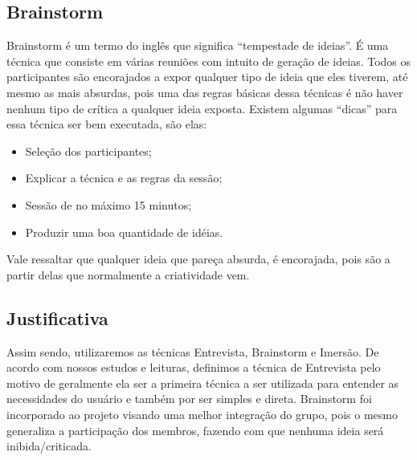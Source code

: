 \subsection{Brainstorm}
Brainstorm é um termo do inglês que significa “tempestade de ideias”. É uma técnica que consiste em várias reuniões com intuito de geração de ideias. Todos os participantes são encorajados a expor qualquer tipo de ideia que eles tiverem, até mesmo as mais absurdas, pois uma das regras básicas dessa técnicas é não haver nenhum tipo de crítica a qualquer ideia exposta. Existem algumas “dicas” para essa técnica ser bem executada, são elas:
\begin{itemize}
\item{Seleção dos participantes;}
\item{Explicar a técnica e as regras da sessão;}
\item{Sessão de no máximo 15 minutos;}
\item{Produzir uma boa quantidade de idéias.}
\end{itemize}
Vale ressaltar que qualquer ideia que pareça absurda, é encorajada, pois são a partir delas que normalmente a criatividade vem.
\subsection{Justificativa}
Assim sendo, utilizaremos as técnicas Entrevista, Brainstorm e Imersão. De acordo com nossos estudos e leituras, definimos a técnica de Entrevista pelo motivo de geralmente ela ser a primeira técnica a ser utilizada para entender as necessidades do usuário e também por ser simples e direta. Brainstorm foi incorporado ao projeto visando uma melhor integração do grupo, pois o mesmo generaliza a participação dos membros, fazendo com que nenhuma ideia será inibida/criticada.